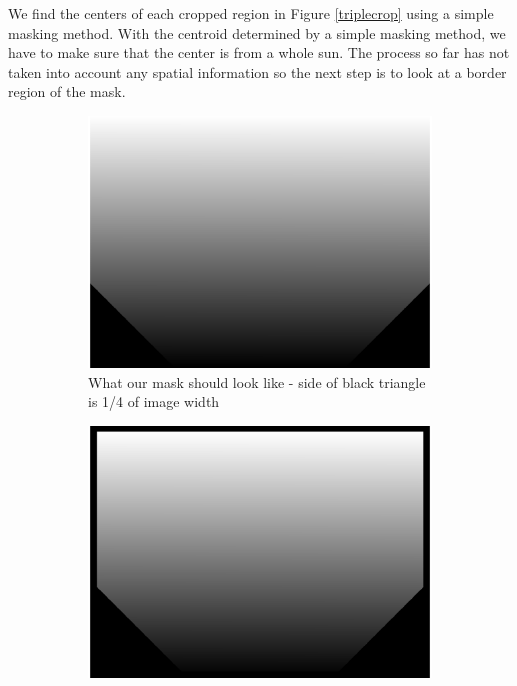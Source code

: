 \documentclass[10pt]{scrartcl}
\begin{document}
	We find the centers of each cropped region in Figure \ref{triplecrop} using a simple masking method. With the centroid determined by a simple masking method, we have to make sure that the center is from a whole sun. The process so far has not taken into account any spatial information so the next step is to look at a border region of the mask. 


\begin{figure}[!ht]
    \centering
    \hspace{-1.0in}
    \begin{subfigure}[b]{.45\linewidth}
        \centering
        \includegraphics[width=1.3\textwidth]{../plots_tables_images/cutcorner.eps}
        \caption{What our mask should look like - side of black triangle is 1/4 of image width}
        \label{noborder}
    \end{subfigure}
    \hspace{.5in}
    \begin{subfigure}[b]{.45\linewidth}
        \centering
        \includegraphics[width=1.3\textwidth]{../plots_tables_images/cutcornerwborder.eps}

\end{subfigure}
\end{figure}
\end{document}
